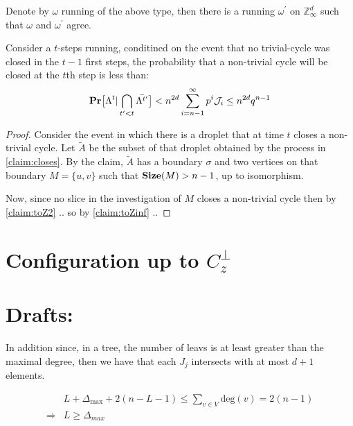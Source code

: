 \begin{claim}
  \label{claim:toZinf}
  Denote by $\omega$ running of the above type, then there is a running $\omega^{\prime}$ on $\mathbb{Z}^{d}_{\infty}$ such that $\omega$ and $\omega^{\prime}$ agree. 
\end{claim}

\begin{claim}
  Consider a $t$-steps running, conditined on the event that no trivial-cycle was closed in the $t-1$ first steps, the probability that a non-trivial cycle will be closed at the $t$th step is less than:
  \begin{equation*}
    \begin{split}
      \mathbf{Pr} \big[  \Lambda^{t} | \bigcap_{t^{\prime} < t} \bar{\Lambda^{t^{\prime}} }  \big] < n^{2d} \sum_{i=n-1}^\infty p^{i} \mathcal{J}_{i} \le  n^{2d} q^{n-1}
    \end{split}
  \end{equation*}
\end{claim}
\begin{proof}
Consider the event in which there is a droplet that at time $t$ closes a non-trivial cycle. Let $\tilde{A}$ be the subset of that droplet obtained by the process in \cref{claim:closes}. By the claim, $\tilde{A}$ has a boundary $\sigma$ and two vertices on that boundary $M=\{u,v\}$ such that $\mathbf{Size}(M) > n-1$, up to isomorphism.

Now, since no slice in the investigation of $M$ closes a non-trivial cycle then by \cref{claim:toZ2} .. so by \cref{claim:toZinf} ..
\end{proof}










\section{Configuration up to $C_{z}^\perp$ }

\section{Drafts:}

    In addition since, in a tree, the number of leavs is at least greater than the maximal degree, then we have that each $J_{j}$ intersects with at most $d+1$ elements. 


    \begin{equation*}
      \begin{split}
       & L + \Delta_{\max} + 2(n - L -1) \le \sum_{v\in V}\text{deg}(v) = 2 (n-1)\\
       \Rightarrow & L \ge \Delta_{max}
      \end{split}
    \end{equation*}
